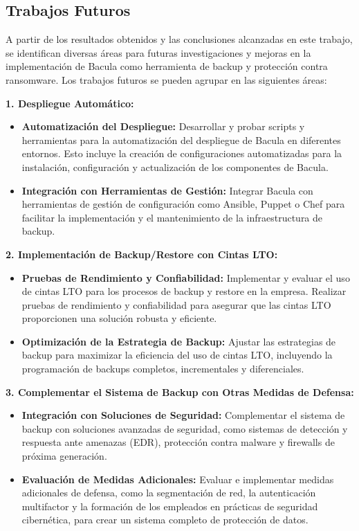 \subsection{Trabajos Futuros}

A partir de los resultados obtenidos y las conclusiones alcanzadas en este trabajo, se identifican diversas áreas para futuras investigaciones y mejoras en la implementación de Bacula como herramienta de backup y protección contra ransomware. Los trabajos futuros se pueden agrupar en las siguientes áreas:

\textbf{1. Despliegue Automático:}
\begin{itemize}
    \item \textbf{Automatización del Despliegue:} Desarrollar y probar scripts y herramientas para la automatización del despliegue de Bacula en diferentes entornos. Esto incluye la creación de configuraciones automatizadas para la instalación, configuración y actualización de los componentes de Bacula.
    \item \textbf{Integración con Herramientas de Gestión:} Integrar Bacula con herramientas de gestión de configuración como Ansible, Puppet o Chef para facilitar la implementación y el mantenimiento de la infraestructura de backup.
\end{itemize}

\textbf{2. Implementación de Backup/Restore con Cintas LTO:}
\begin{itemize}
    \item \textbf{Pruebas de Rendimiento y Confiabilidad:} Implementar y evaluar el uso de cintas LTO para los procesos de backup y restore en la empresa. Realizar pruebas de rendimiento y confiabilidad para asegurar que las cintas LTO proporcionen una solución robusta y eficiente.
    \item \textbf{Optimización de la Estrategia de Backup:} Ajustar las estrategias de backup para maximizar la eficiencia del uso de cintas LTO, incluyendo la programación de backups completos, incrementales y diferenciales.
\end{itemize}

\textbf{3. Complementar el Sistema de Backup con Otras Medidas de Defensa:}
\begin{itemize}
    \item \textbf{Integración con Soluciones de Seguridad:} Complementar el sistema de backup con soluciones avanzadas de seguridad, como sistemas de detección y respuesta ante amenazas (EDR), protección contra malware y firewalls de próxima generación.
    \item \textbf{Evaluación de Medidas Adicionales:} Evaluar e implementar medidas adicionales de defensa, como la segmentación de red, la autenticación multifactor y la formación de los empleados en prácticas de seguridad cibernética, para crear un sistema completo de protección de datos.
\end{itemize}